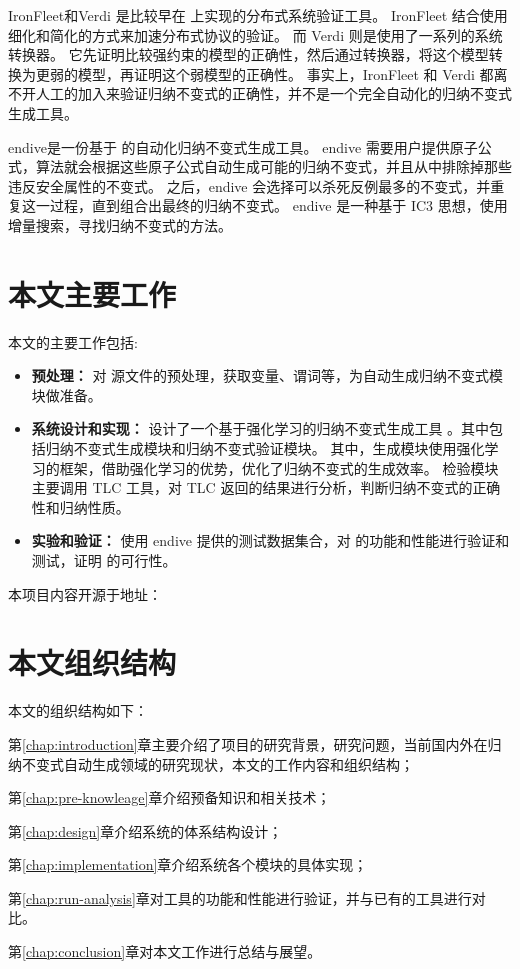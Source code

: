 IronFleet\cite{IronFleet}和Verdi\cite{Verdi} 是比较早在 \TLA 上实现的分布式系统验证工具。
IronFleet 结合使用细化和简化的方式来加速分布式协议的验证。
而 Verdi 则是使用了一系列的系统转换器。
它先证明比较强约束的模型的正确性，然后通过转换器，将这个模型转换为更弱的模型，再证明这个弱模型的正确性。
事实上，IronFleet 和 Verdi 都离不开人工的加入来验证归纳不变式的正确性，并不是一个完全自动化的归纳不变式生成工具。

endive\cite{endive}是一份基于 \TLA 的自动化归纳不变式生成工具。
endive 需要用户提供原子公式，算法就会根据这些原子公式自动生成可能的归纳不变式，并且从中排除掉那些违反安全属性的不变式。
之后，endive 会选择可以杀死反例最多的不变式，并重复这一过程，直到组合出最终的归纳不变式。
endive 是一种基于 IC3 思想，使用增量搜索，寻找归纳不变式的方法。

\section{本文主要工作}

本文的主要工作包括:
\begin{itemize}
    \item \textbf{预处理：} 对 \TLA  源文件的预处理，获取变量、谓词等，为自动生成归纳不变式模块做准备。
    \item \textbf{系统设计和实现：} 设计了一个基于强化学习的归纳不变式生成工具 \rltla。其中包括归纳不变式生成模块和归纳不变式验证模块。
其中，生成模块使用强化学习的框架，借助强化学习的优势，优化了归纳不变式的生成效率。
检验模块主要调用 TLC 工具，对 TLC 返回的结果进行分析，判断归纳不变式的正确性和归纳性质。
    \item \textbf{实验和验证：} 使用 endive 提供的测试数据集合，对 \rltla 的功能和性能进行验证和测试，证明 \rltla 的可行性。
\end{itemize}

本项目内容开源于地址：

\section{本文组织结构}
本文的组织结构如下：

第\ref{chap:introduction}章主要介绍了项目的研究背景，研究问题，当前国内外在归纳不变式自动生成领域的研究现状，本文的工作内容和组织结构；

第\ref{chap:pre-knowleage}章介绍预备知识和相关技术；

第\ref{chap:design}章介绍系统的体系结构设计；

第\ref{chap:implementation}章介绍系统各个模块的具体实现；

第\ref{chap:run-analysis}章对工具的功能和性能进行验证，并与已有的工具进行对比。

第\ref{chap:conclusion}章对本文工作进行总结与展望。

